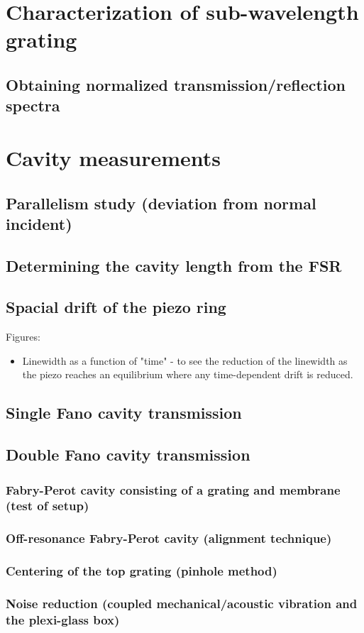 \section{Characterization of sub-wavelength grating}

\subsection{Obtaining normalized transmission/reflection spectra}

\section{Cavity measurements}

\subsection{Parallelism study (deviation from normal incident)}

\subsection{Determining the cavity length from the FSR}

\subsection{Spacial drift of the piezo ring}

Figures: 
\begin{itemize}
    \item Linewidth as a function of "time" - to see the reduction of the linewidth as the piezo reaches an equilibrium where any time-dependent drift is reduced. 
\end{itemize}

\subsection{Single Fano cavity transmission} 

\subsection{Double Fano cavity transmission}

\subsubsection{Fabry-Perot cavity consisting of a grating and membrane (test of setup)}

\subsubsection{Off-resonance Fabry-Perot cavity (alignment technique)}

\subsubsection{Centering of the top grating (pinhole method)}

\subsubsection{Noise reduction (coupled mechanical/acoustic vibration and the plexi-glass box)} 